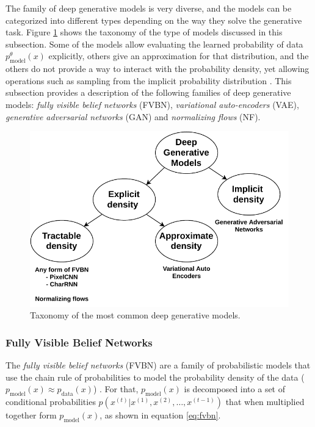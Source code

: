 The family of deep generative models is very diverse, and the models can be categorized into different types depending on the way they solve the generative task. Figure \ref{fig:generativetaxonomy} shows the taxonomy of the type of models discussed in this subsection. Some of the models allow evaluating the learned probability of data $p^\theta_\mathrm{model}(x)$ explicitly, others give an approximation for that distribution, and the others do not provide a way to interact with the probability density, yet allowing operations such as sampling from the implicit probability distribution \autocite{Goodfellow2016}. This subsection provides a description of the following families of deep generative models: \textit{fully visible belief networks} (FVBN), \textit{variational auto-encoders} (VAE), \textit{generative adversarial networks} (GAN) and \textit{normalizing flows} (NF).

\begin{figure}[h!]
	\centering
	\includegraphics[width=0.85\linewidth]{background/images/generativetaxonomy}
	\caption[Taxonomy of deep generative models]{Taxonomy of the most common deep generative models.}
	\label{fig:generativetaxonomy}
\end{figure}


\subsubsection{Fully Visible Belief Networks}
The \textit{fully visible belief networks} (FVBN) are a family of probabilistic models that use the chain rule of probabilities to model the probability density of the data ($p_\mathrm{model}(x) \approx p_\mathrm{data}(x)$) \autocite{smith2018}. For that, $p_\mathrm{model}(x)$ is decomposed into a set of conditional probabilities $p(x^{(t)}| x^{(1)}, x^{(2)}, \ldots, x^{(t-1)})$ that when multiplied together form  $p_\mathrm{model}(x)$, as shown in equation \ref{eq:fvbn}.

